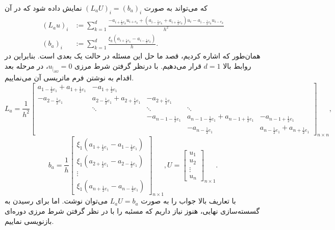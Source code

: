 که می‌تواند به صورت $(L_a U)_i = (b_a)_i$ نمایش داده شود که در آن 
\begin{align}
	\label{def:L_a}
	(L_a u)_i &:= \sum_{k=1}^{d} \frac{-a_{i+\frac{1}{2}e_k} u_{i+e_k} + (a_{i-\frac{1}{2}e_k} + a_{i+\frac{1}{2}e_k})u_i - a_{i-\frac{1}{2}e_k} u_{i-e_k} }{h^2}\\
	\label{def:b_a}
	(b_a)_i &:= \sum_{k=1}^{d} \frac{\xi_k (a_{i+\frac{1}{2}e_k} - a_{i-\frac{1}{2}e_k})}{h} .
\end{align}
همان‌طور که اشاره کردیم، قصد ما حل این مسئله در حالت یک بعدی است. بنابراین در روابط بالا $d=1$ قرار می‌دهیم. با درنظر گرفتن شرط مرزی $u_{\vert_{\partial\Omega}} = 0$، در مرحله بعد اقدام به نوشتن فرم ماتریسی آن می‌نماییم.
\begin{equation*}
	L_{a} = \frac{1}{h^2}\begin{bmatrix}
		a_{1 - \frac{1}{2}e_{1}} + a_{1 + \frac{1}{2}e_{1}}  &  -a_{1+\frac{1}{2}e_{1}} &  &  &  \\
		-a_{2-\frac{1}{2}e_{1}}&a_{2 - \frac{1}{2}e_{1}} + a_{2 + \frac{1}{2}e_{1}}& -a_{2 + \frac{1}{2}e_{1}} & & \\
		& \ddots& \ddots &\ddots  &  \\
		& & -a_{n-1-\frac{1}{2}e_{1}}&a_{n-1 - \frac{1}{2}e_{1}} + a_{n-1 + \frac{1}{2}e_{1}}&-a_{n-1 + \frac{1}{2}e_{1}}\\
		& & & -a_{n-\frac{1}{2}e_{1}} &a_{n-\frac{1}{2}e_{1}} + a_{n+\frac{1}{2}e_{1}}
	\end{bmatrix}_{n \times n},
\end{equation*}
\begin{equation*}
	b_a = \frac{1}{h}\begin{bmatrix}
		\xi_1 (a_{1+\frac{1}{2}e_{1}} - a_{1-\frac{1}{2}e_{1}}) \\
		\xi_1 (a_{2+\frac{1}{2}e_{1}} - a_{2-\frac{1}{2}e_{1}}) \\
		\vdots \\
		\xi_1 (a_{n+\frac{1}{2}e_{1}} - a_{n-\frac{1}{2}e_{1}})
	\end{bmatrix}_{n \times 1},
	U = \begin{bmatrix}
		u_{1} \\
		u_{2} \\
		\vdots \\
		u_{n}
	\end{bmatrix}_{n \times 1}.
\end{equation*}
با تعاریف بالا جواب را به صورت $L_a U = b_a$ می‌توان نوشت. اما برای رسیدن به گسسته‌سازی نهایی، هنوز نیاز داریم که مسئبه را با در نظر گرفتن شرط مرزی دوره‌ای بازنویسی نماییم.
